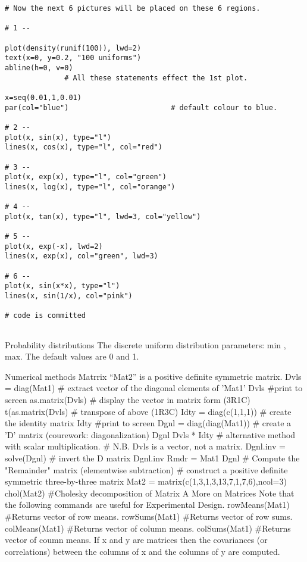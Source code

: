\begin{verbatim}
# Now the next 6 pictures will be placed on these 6 regions. 

# 1 --

plot(density(runif(100)), lwd=2)
text(x=0, y=0.2, "100 uniforms")        
abline(h=0, v=0)
	          # All these statements effect the 1st plot.

x=seq(0.01,1,0.01)
par(col="blue")                        # default colour to blue.

# 2 --
plot(x, sin(x), type="l")
lines(x, cos(x), type="l", col="red")

# 3 --
plot(x, exp(x), type="l", col="green")
lines(x, log(x), type="l", col="orange")

# 4 --
plot(x, tan(x), type="l", lwd=3, col="yellow")

# 5 --
plot(x, exp(-x), lwd=2)
lines(x, exp(x), col="green", lwd=3)

# 6 --
plot(x, sin(x*x), type="l")
lines(x, sin(1/x), col="pink")

# code is committed
 
\end{verbatim}

 
Probability distributions
The discrete uniform distribution
parameters: min , max.
The default values are 0 and 1.
 

Numerical methods
Matrrix “Mat2” is a positive definite symmetric matrix.
Dvls = diag(Mat1)		# extract vector of the diagonal elements of 'Mat1'
Dvls				#print to screen
as.matrix(Dvls)			# display the vector in matrix form (3R1C)
t(as.matrix(Dvls)		# transpose of above	(1R3C)
Idty = diag(c(1,1,1))		# create the identity matrix
Idty				#print to screen
Dgnl = diag(diag(Mat1))	# create a 'D' matrix 	(courework: diagonalization)
Dgnl				
Dvls * Idty			# alternative method with scalar multiplication.
				# N.B.  Dvls is a vector, not a matrix.
Dgnl.inv = solve(Dgnl)		# invert the D matrix
Dgnl.inv		
Rmdr = Mat1 Dgnl		# Compute the "Remainder" matrix (elementwise subtraction)
# construct a positive definite symmetric three-by-three matrix
Mat2 = matrix(c(1,3,1,3,13,7,1,7,6),ncol=3)
chol(Mat2)			#Cholesky decomposition of Matrix A
More on Matrices
Note that the following commands are useful for Experimental Design.
rowMeans(Mat1) 			#Returns vector of row means. 
rowSums(Mat1) 			#Returns vector of row sums.  
colMeans(Mat1) 			#Returns vector of column means.  
colSums(Mat1) 				#Returns vector of coumn means.  
If x and y are matrices then the covariances (or correlations) between the columns of x and the columns of y are computed.


